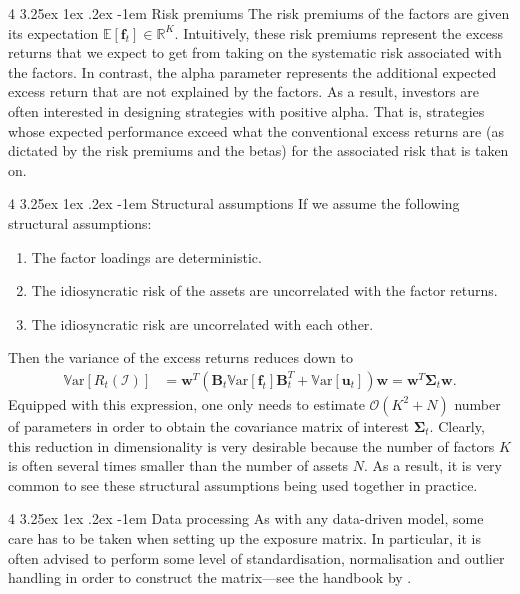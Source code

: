 \documentclass[12pt]{article}
\makeatletter
\renewcommand\paragraph{%
	\@startsection{paragraph}
	{4}
	{\z@}
	{3.25ex \@plus1ex \@minus.2ex}
	{-1em}
	{\normalfont\normalsize\bfseries\maybe@addperiod}%
}
\newcommand{\maybe@addperiod}[1]{%
	#1\@addpunct{.}%
}
\makeatother
\begin{document}
\paragraph{Risk premiums} The risk premiums of the factors are given its expectation $\mathbb{E}[\mathbf{f}_t] \in \mathbb{R}^K$. Intuitively, these risk premiums represent the excess returns that we expect to get from taking on the systematic risk associated with the factors. In contrast, the alpha parameter represents the additional expected excess return that are not explained by the factors. As a result, investors are often interested in designing strategies with positive alpha. That is, strategies whose expected performance exceed what the conventional excess returns are (as dictated by the risk premiums and the betas) for the associated risk that is taken on.

\paragraph{Structural assumptions} If we assume the following structural assumptions:
\begin{enumerate}
	\item The factor loadings are deterministic.
	\item The idiosyncratic risk of the assets are uncorrelated with the factor returns.
	\item The idiosyncratic risk are uncorrelated with each other.
\end{enumerate}
Then the variance of the excess returns reduces down to
\begin{align}
	\mathbb{V}\text{ar}[R_t(\mathcal{I})]
	&= \mathbf{w}^T \left( \mathbf{B}_t\mathbb{V}\text{ar}[\mathbf{f}_t] \mathbf{B}_t^T + \mathbb{V}\text{ar}[\mathbf{u}_t]\right) \mathbf{w}
	= \mathbf{w}^T \boldsymbol{\Sigma}_t \mathbf{w}.
\end{align}
Equipped with this expression, one only needs to estimate $\mathcal{O}(K^2 + N)$ number of parameters in order to obtain the covariance matrix of interest $\boldsymbol{\Sigma}_t$. Clearly, this reduction in dimensionality is very desirable because the number of factors $K$ is often several times smaller than the number of assets $N$. As a result, it is very common to see these structural assumptions being used together in practice. 

\paragraph{Data processing} As with any data-driven model, some care has to be taken when setting up the exposure matrix. In particular, it is often advised to perform some level of standardisation, normalisation and outlier handling in order to construct the matrix---see the handbook by \cite{axioma2007}.
\end{document}
